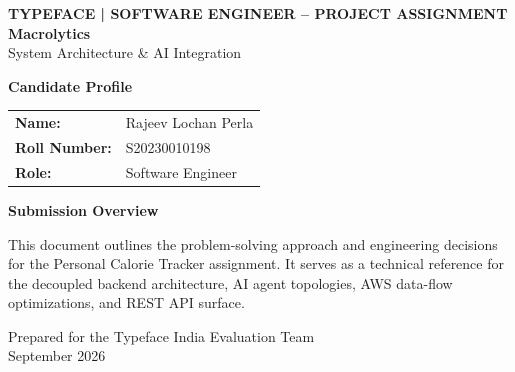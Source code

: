 \documentclass[11pt,a4paper,twoside]{article}
\newcommand{\docsubtitle}{System Architecture \& AI Integration}
\begin{document}
\begin{titlepage}
  \thispagestyle{empty}
  \vspace*{18mm}
  \begin{flushleft}
    {\sffamily\color{brand}\bfseries\small TYPEFACE | SOFTWARE ENGINEER -- PROJECT ASSIGNMENT}\\[8mm]
    {\sffamily\bfseries\fontsize{31}{35}\selectfont\color{ink} Macrolytics}\\[3mm]
    {\sffamily\fontsize{18}{23}\selectfont\color{brandDark} \docsubtitle}
  \end{flushleft}

  \vspace{16mm}
  \begin{tcolorbox}[enhanced,colback=paper,colframe=line,boxrule=0.5pt,arc=7pt,left=14pt,right=14pt,top=12pt,bottom=12pt]
    \sffamily
    \textbf{Candidate Profile}\par
    \vspace{6pt}
    \begin{tabular}{@{}l l}
      \textbf{Name:} & Rajeev Lochan Perla \\
      \textbf{Roll Number:} & S20230010198 \\
      \textbf{Role:} & Software Engineer \\
    \end{tabular}

    \vspace{14pt}
    \textbf{Submission Overview}\par
    \vspace{4pt}
    This document outlines the problem-solving approach and engineering decisions for the Personal Calorie Tracker assignment. It serves as a technical reference for the decoupled backend architecture, AI agent topologies, AWS data-flow optimizations, and REST API surface.
  \end{tcolorbox}

  \vfill
  \begin{flushleft}
    {\sffamily\color{muted}\small Prepared for the Typeface India Evaluation Team}\\
    {\sffamily\color{muted}\small September 2026}
  \end{flushleft}
\end{titlepage}

\setcounter{page}{1}
\tableofcontents
\clearpage
\setcounter{page}{1}
\def\theHpage{content.\arabic{page}}
\end{document}
